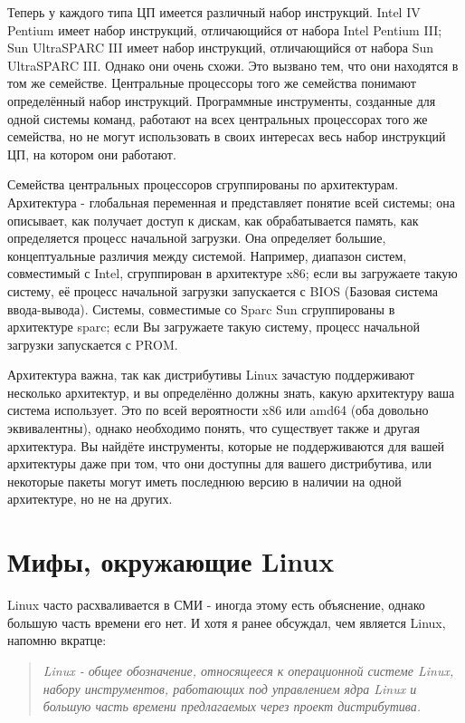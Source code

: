\documentclass[12pt]{book}
\begin{document}
Теперь у каждого типа ЦП имеется различный набор инструкций. Intel IV Pentium имеет набор инструкций, отличающийся от набора Intel Pentium III; Sun UltraSPARC III  имеет набор инструкций, отличающийся от набора Sun UltraSPARC III. Однако они очень схожи. Это вызвано тем, что они находятся в том же семействе. Центральные процессоры того же семейства понимают определённый набор инструкций. Программные инструменты, созданные для одной системы команд, работают на всех центральных процессорах того же семейства, но не могут использовать в своих интересах весь набор инструкций ЦП, на котором они работают.

Семейства центральных процессоров сгруппированы по архитектурам. Архитектура - глобальная переменная и представляет понятие всей системы; она описывает, как получает доступ к дискам, как обрабатывается память, как определяется процесс начальной загрузки. Она определяет большие, концептуальные различия между системой. Например, диапазон систем, совместимый с Intel, сгруппирован в архитектуре x86; если вы загружаете такую систему, её процесс начальной загрузки запускается с BIOS (Базовая система ввода-вывода). Системы, совместимые со Sparc Sun сгруппированы в архитектуре sparc; если Вы загружаете такую систему, процесс начальной загрузки запускается с PROM.

Архитектура важна, так как дистрибутивы Linux зачастую поддерживают нес\-колько архитектур, и вы определённо должны знать, какую архитектуру  ваша система использует. Это по всей вероятности x86 или amd64 (оба довольно эквивалентны), однако необходимо понять, что существует также и другая архитектура. Вы найдёте инструменты, которые не поддерживаются для вашей архитектуры даже при том, что они доступны для вашего дистрибутива, или некоторые пакеты могут иметь последнюю версию в наличии на одной архитектуре, но не на других.

\section{Мифы, окружающие Linux}

Linux часто расхваливается в СМИ - иногда этому есть объяснение, однако большую часть времени его нет. И хотя я ранее обсуждал, чем является Linux, напомню вкратце:

\begin{quote}
\emph{Linux - общее обозначение, относящееся к операционной системе Linux, набору инструментов, работающих под управлением ядра Linux и большую часть времени предлагаемых через проект дистрибутива.}
\end{quote}
\end{document}
